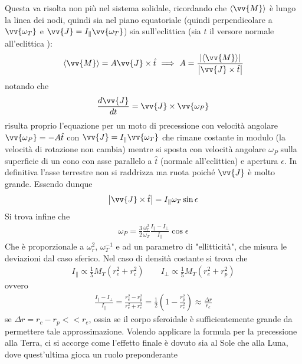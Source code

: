 \documentclass[a4paper, oneside]{book}
\begin{document}
Questa va risolta non più nel sistema solidale, ricordando che $\left< \vv{M}  \right>$ è lungo 
la linea dei nodi, quindi sia nel piano equatoriale (quindi perpendicolare a $\vv{\omega_T}$ e $\vv{J  } = I_\parallel \vv{\omega_T}$) 
sia sull'eclittica (sia $\hat{t}$ il versore normale all'eclittica  ):
\begin{gather*}
    \left< \vv{M}  \right> = A \vv{J} \times \hat{t} \ \Longrightarrow \ A = \frac{\left| \left< \vv{M}  \right>  \right| }{\left| \vv{J} \times \hat{t}   \right| }   
\end{gather*}
notando che 
\begin{gather*}
    \frac{d\vv{J} }{dt} = \vv{J} \times \vv{\omega_P}  
\end{gather*}
risulta proprio l'equazione per un moto di precessione con velocità 
angolare $\vv{\omega_P} = - A\hat{t}$ con $\vv{J} = I_\parallel \vv{\omega_T}$ 
che rimane costante in modulo (la velocità di rotazione non cambia) mentre 
si sposta con velocità angolare $\omega_P$ sulla superficie di un cono
con asse parallelo a $\hat{t}$ (normale all'eclittica) e apertura $\epsilon$. 
In definitiva l'asse terrestre non si raddrizza ma ruota poiché $\vv{J}$ è molto grande.
Essendo dunque
\begin{gather*}
    \left| \vv{J} \times \hat{t}   \right| = I_\parallel \omega_T \sin\epsilon 
\end{gather*}     
Si trova infine che
\begin{align}
    \boxed{\omega_P = \frac{3}{2} \frac{\omega_r^{2}}{\omega_T} \frac{I_\parallel - I_\perp}{I_\parallel} \cos\epsilon}
\end{align}
Che è proporzionale a $\omega_r^{2}$, $\omega_T^{-1}$ e ad un parametro di "ellitticità", 
che misura le deviazioni dal caso sferico. Nel caso di densità costante si trova che 
\begin{gather*}
    I_\parallel \propto \frac{1}{5}M_T(r_e^{2} + r_c^{2}) \qquad I_\perp \propto \frac{1}{5}M_T(r_e^{2} + r_p^{2})
\end{gather*}
ovvero 
\begin{gather*}
    \frac{I_\parallel - I_\perp}{I_\parallel} = \frac{r_e^{2} - r_p^{2}}{r_e^{2} + r_c^{2}} = \frac{1}{2} \left(1 - \frac{r_p^{2}}{r_e^{2}}\right) \approx \frac{\Delta r}{r_e}
\end{gather*}
se $\Delta r = r_c - r_p << r_e$, ossia se il corpo sferoidale è 
sufficientemente grande da permettere tale approssimazione. 
Volendo applicare la formula per la precessione alla Terra, ci si accorge come 
l'effetto finale è dovuto sia al Sole che alla Luna, dove quest'ultima gioca un ruolo preponderante
\end{document}

